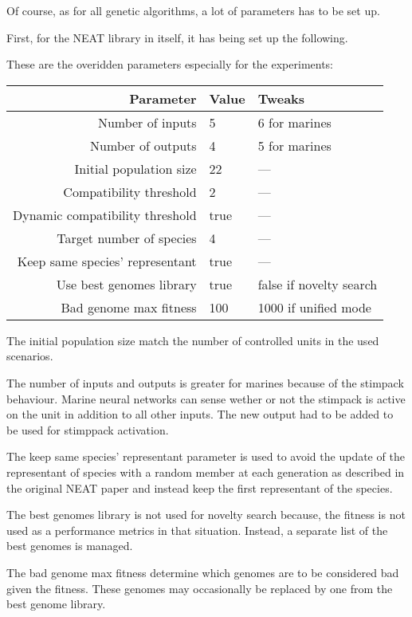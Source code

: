 Of course, as for all genetic algorithms, a lot of parameters has to be set up.

First, for the NEAT library in itself, it has being set up the following.

These are the overidden parameters especially for the experiments:

\begin{tabular}{rll}
    \toprule
    Parameter & Value & Tweaks \\
    \midrule
    Number of inputs & 5 & 6 for marines \\
    Number of outputs & 4 & 5 for marines \\
    Initial population size & 22  & — \\[1ex]

    Compatibility threshold & 2 & — \\
    Dynamic compatibility threshold & true & — \\
    Target number of species & 4 & — \\
    Keep same species' representant & true & — \\[1ex]

    Use best genomes library & true & false if novelty search \\
    Bad genome max fitness & 100 & 1000 if unified mode \\
    \bottomrule
\end{tabular}

The initial population size match the number of controlled units in the used scenarios.

The number of inputs and outputs is greater for marines because
of the stimpack behaviour.
Marine neural networks can sense wether or not the stimpack is active
on the unit in addition to all other inputs.
The new output had to be added to be used for stimppack activation.

The keep same species' representant parameter is used to avoid the update
of the representant of species with a
random member at each generation as described in the original NEAT paper
and instead keep the first representant of the species.

The best genomes library is not used for novelty search because, the fitness
is not used as a performance metrics in
that situation. Instead, a separate list of the best genomes is managed.

The bad genome max fitness determine which genomes are to be considered bad given
the fitness. These genomes may occasionally be replaced by one from the best genome
library.

